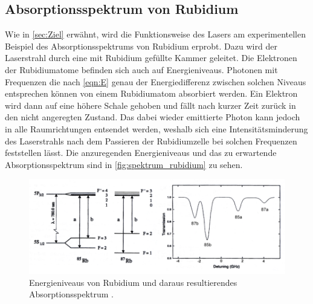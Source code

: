 \subsection{Absorptionsspektrum von Rubidium}
Wie in \autoref{sec:Ziel} erwähnt, wird die Funktionsweise des Lasers am experimentellen Beispiel des Absorptionsspektrums von Rubidium erprobt. 
Dazu wird der Laserstrahl durch eine mit Rubidium gefüllte Kammer geleitet. Die Elektronen der Rubidiumatome befinden sich auch auf Energieniveaus.
Photonen mit Frequenzen die nach \autoref{eqn:E} genau der Energiedifferenz zwischen solchen Niveaus entsprechen können von einem Rubidiumatom absorbiert werden.
Ein Elektron wird dann auf eine höhere Schale gehoben und fällt nach kurzer Zeit zurück in den nicht angeregten Zustand. Das dabei wieder emittierte Photon kann jedoch
in alle Raumrichtungen entsendet werden, weshalb sich eine Intensitätsminderung des Laserstrahls nach dem Passieren der Rubidiumzelle bei solchen Frequenzen feststellen lässt. 
Die anzuregenden Energieniveaus und das zu erwartende Absorptionsspektrum sind in \autoref{fig:spektrum_rubidium} zu sehen.

\begin{figure}
    \centering
    \includegraphics[scale=0.55]{content/pics/spektrum_rubidium.png}
    \caption{Energieniveaus von Rubidium und daraus resultierendes Absorptionsspektrum \cite{diode_laser_spectroscopy}.}
    \label{fig:spektrum_rubidium}
\end{figure}
